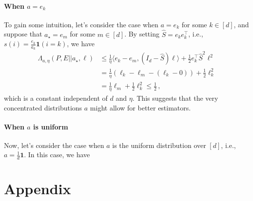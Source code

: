 \documentclass{article}
\theoremstyle{plain}
\theoremstyle{definition}
\begin{document}
\paragraph{When $a = e_k$}
To gain some intuition, let's consider the case when $a = e_k$ for some $k \in [d]$,
and suppose that $a_\star = e_m$ for some $m \in [d]$.
By setting $\hat{S} = e_k e_k^\top$, i.e., $s(i) = \frac{e_k}{a_k} \mathbf{1}(i = k)$,
we have
\begin{align*}
    \Lambda_{a, \eta}(P, E || a_\star, \ell)
     & \leq
    \frac{1}{\eta}
    \langle e_k - e_m, (I_d - \hat{S}) \ell \rangle
    +
    \frac{1}{2}
    e_k^\top
    \hat{S}^2
    \ell^2
    \\
     & =
    \frac{1}{\eta}
    \left(
    \ell_k - \ell_m
    - (\ell_k - 0)
    \right)
    +
    \frac{1}{2}
    \ell_k^2
    \\
     & =
    \frac{1}{\eta} \ell_m
    +
    \frac{1}{2} \ell_k^2
    \leq
    \frac{1}{2}\,,
\end{align*}
which is a constant independent of $d$ and $\eta$.
This suggests that the very concentrated distributions $a$ might allow for better estimators.

\paragraph{When $a$ is uniform}
Now, let's consider the case when $a$ is the uniform distribution over $[d]$,
i.e., $a = \frac{1}{d} \mathbf{1}$.
In this case, we have









\newpage

% 


\clearpage


\clearpage

\appendix
\section{Appendix}
\label{sec:appendix}
\end{document}
